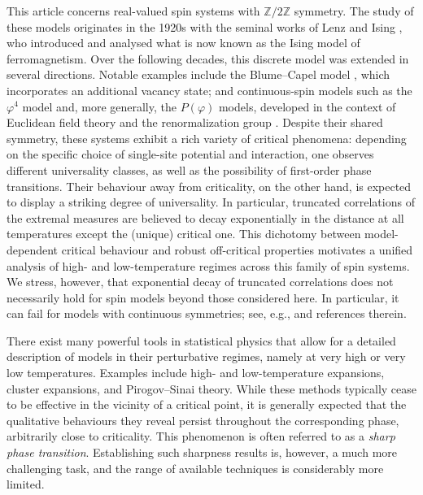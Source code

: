 \documentclass[11pt,a4paper]{article}
\numberwithin{equation}{section}
\theoremstyle{plain}
\theoremstyle{definition}
\begin{document}
This article concerns real-valued spin systems with $\mathbb Z/2\mathbb Z$ symmetry. The study of these models originates in the 1920s with the seminal works of Lenz \cite{Lenz1920beitrag} and Ising \cite{Ising1924}, who introduced and analysed what is now known as the Ising model of ferromagnetism. Over the following decades, this discrete model was extended in several directions. Notable examples include the Blume--Capel model \cite{BL,Capel}, which incorporates an additional vacancy state; and continuous-spin models such as the $\varphi^4$ model and, more generally, the $P(\varphi)$ models, developed in the context of Euclidean field theory and the renormalization group \cite{GlimmJaffeQuantumBOOK}. Despite their shared symmetry, these systems exhibit a rich variety of critical phenomena: depending on the specific choice of single-site potential and interaction, one observes different universality classes, as well as the possibility of first-order phase transitions. Their behaviour away from criticality, on the other hand, is expected to display a striking degree of universality. 
In particular, truncated correlations of the extremal measures are believed to decay exponentially in the distance at all temperatures except the (unique) critical one. This dichotomy between model-dependent critical behaviour and robust off-critical properties motivates a unified analysis of high- and low-temperature regimes across this family of spin systems. 
We stress, however, that exponential decay of truncated correlations does not necessarily hold for spin models beyond those considered here. In particular, it can fail for models with continuous symmetries; see, e.g., \cite{DarioWu24Villain} and references therein.

There exist many powerful tools in statistical physics that allow for a detailed description of models in their perturbative regimes, namely at very high or very low temperatures. Examples include high- and low-temperature expansions, cluster expansions, and Pirogov--Sinai theory. While these methods typically cease to be effective in the vicinity of a critical point, it is generally expected that the qualitative behaviours they reveal persist throughout the corresponding phase, arbitrarily close to criticality. This phenomenon is often referred to as a \emph{sharp phase transition}. Establishing such sharpness results is, however, a much more challenging task, and the range of available techniques is considerably more limited.
\end{document}
